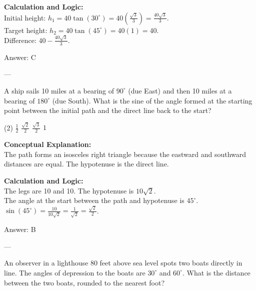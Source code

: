 \documentclass[11pt,paper=a4,answers]{exam}
\begin{document}
\begin{questions}
\begin{solution}
\vspace{10pt}
\textbf{Calculation and Logic:} \\
Initial height: $h_1 = 40 \tan(30^\circ) = 40(\frac{\sqrt{3}}{3}) = \frac{40\sqrt{3}}{3}$. \\
Target height: $h_2 = 40 \tan(45^\circ) = 40(1) = 40$. \\
Difference: $40 - \frac{40\sqrt{3}}{3}$.

\vspace{15pt}
Answer: \colorbox{yellow!100}{C}
\end{solution}

---

\question
A ship sails 10 miles at a bearing of $90^\circ$ (due East) and then 10 miles at a bearing of $180^\circ$ (due South). What is the sine of the angle formed at the starting point between the initial path and the direct line back to the start?
\begin{tasks}(2)
    \task $\frac{1}{2}$
    \task $\frac{\sqrt{2}}{2}$
    \task $\frac{\sqrt{3}}{2}$
    \task $1$
\end{tasks}

\begin{solution}
\textbf{Conceptual Explanation:} \\
The path forms an isosceles right triangle because the eastward and southward distances are equal. The hypotenuse is the direct line.

\vspace{10pt}
\textbf{Calculation and Logic:} \\
The legs are 10 and 10. The hypotenuse is $10\sqrt{2}$. \\
The angle at the start between the path and hypotenuse is $45^\circ$. \\
$\sin(45^\circ) = \frac{10}{10\sqrt{2}} = \frac{1}{\sqrt{2}} = \frac{\sqrt{2}}{2}$.

\vspace{15pt}
Answer: \colorbox{yellow!100}{B}
\end{solution}

---

\question
An observer in a lighthouse 80 feet above sea level spots two boats directly in line. The angles of depression to the boats are $30^\circ$ and $60^\circ$. What is the distance between the two boats, rounded to the nearest foot?
\begin{center}
\end{center}


\end{questions}
\end{document}
